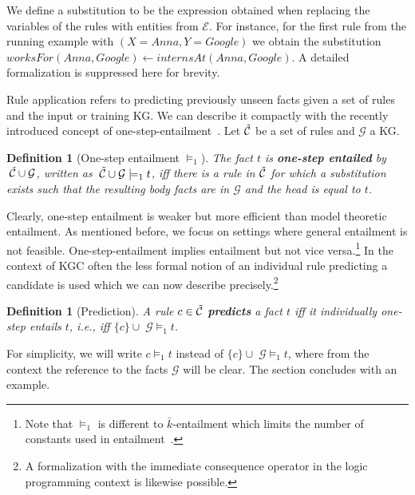 \documentclass{article}
\theoremstyle{plain}
\newtheorem{definition}[theorem]{Definition}
\theoremstyle{remark}
\newcommand{\allatomrules}{\Tilde{\mathcal{C}}}
\newcommand{\atomrule}{c}
\newcommand{\triple}{t}
\newcommand{\alltriples}{\mathcal{G}}
\newcommand{\tFiredAtomRulesG}{\mathcal{C}_\triple(\alltriples)}
\begin{document}
We define a substitution to be the expression obtained when replacing the variables of the rules with entities from $\mathcal{E}$. For instance, for the first rule from the running example with $(X{=}Anna, Y{=}Google)$ we obtain the substitution $worksFor(Anna,Google) {\leftarrow} internsAt(Anna, Google)$. A detailed formalization is suppressed here for brevity.

Rule application refers to predicting previously unseen facts given a set of rules and the input or training KG. We can describe it compactly with the recently introduced concept of one-step-entailment~\cite{betz2022adversarial}. Let $\allatomrules$ be a set of rules and $\alltriples$ a KG.

\begin{definition}[One-step entailment $\models_1$]\label{def:one-step}
The fact $t$ is \textbf{one-step entailed} by $\: \allatomrules \cup \alltriples$, written as $\: \allatomrules \cup \alltriples \models_1 t$, iff there is a rule in $\allatomrules$ for which a substitution exists such that the resulting body facts are in $\alltriples$ and the head is equal to $t$.
\end{definition}
Clearly, one-step entailment is weaker but more efficient than model theoretic entailment. As mentioned before, we focus on settings where general entailment is not feasible. One-step-entailment implies entailment but not vice versa.\footnote{Note that $\models_1$ is different to $\bar{k}$-entailment which limits the number of constants used in entailment~\cite{kuzelka2018pac}.} In the context of KGC often the less formal notion of an individual rule predicting a candidate is used which we can now describe precisely.\footnote{A formalization with the immediate consequence operator in the logic programming context is likewise possible.} 
\begin{definition}[Prediction]\label{def:prediction}
A rule $\atomrule \in \allatomrules$ \textbf{predicts} a fact $t$ iff it individually one-step entails $t$, i.e., iff $\{\atomrule\} \cup \; \alltriples \models_1 t$.
\end{definition}
For simplicity, we will write $c \models_1 t$ instead of $\{\atomrule\} \cup \; \alltriples \models_1 t$, where from the context the reference to the facts $\alltriples$ will be clear.
The section concludes with an example.
\end{document}
